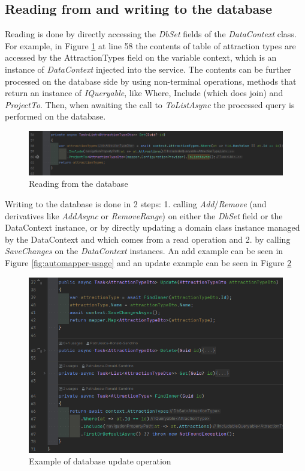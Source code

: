 \subsection{Reading from and writing to the database}

\par Reading is done by directly accessing the \textit{DbSet} fields of the \textit{DataContext} class. For example, in Figure \ref{fig:database-read} at line 58 the contents of table of attraction types are accessed by the AttractionTypes field on the variable context, which is an instance of \textit{DataContext} injected into the service. The contents can be further processed on the database side by using non-terminal operations, methods that return an instance of \textit{IQueryable}, like Where, Include (which does join) and \textit{ProjectTo}. Then, when awaiting the call to \textit{ToListAsync} the processed query is performed on the database.

\begin{figure}[!ht]
    \centering
    \includegraphics[width=1\linewidth]{4.3.3_database-read.png}
    \caption{Reading from the database}
    \label{fig:database-read}
\end{figure}

\par Writing to the database is done in 2 steps: 1. calling \textit{Add}/\textit{Remove} (and derivatives like \textit{AddAsync} or \textit{RemoveRange}) on either the \textit{DbSet} field or the DataContext instance, or by directly updating a domain class instance managed by the DataContext and which comes from a read operation and 2. by calling \textit{SaveChanges} on the \textit{DataContext} instances. An add example can be seen in Figure \ref{fig:automapper-usage} and an update example can be seen in Figure \ref{fig:database-write-update}

\begin{figure}[!ht]
    \centering
    \includegraphics[width=1\linewidth]{4.3.3_database-write-update.png}
    \caption{Example of database update operation}
    \label{fig:database-write-update}
\end{figure}

